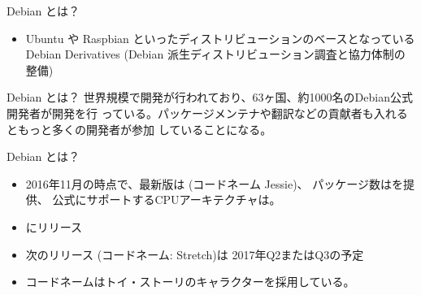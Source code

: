 \begin{frame}{Debian とは？}

\begin{minipage}{0.45\hsize}
  \begin{itemize}
\item Ubuntu や Raspbian といったディストリビューションのベースとなっている \\
	Debian Derivatives (Debian 派生ディストリビューション調査と協力体制の整備)
  \end{itemize}
\end{minipage} 
\begin{minipage}{0.45\hsize}
 \begin{center} 
 \end{center}
\end{minipage}

\end{frame}

\begin{frame}{Debian とは？}
 世界規模で開発が行われており、63ヶ国、約1000名のDebian公式開発者が開発を行
 っている。パッケージメンテナや翻訳などの貢献者も入れるともっと多くの開発者が参加
 していることになる。
 \begin{center}
 \end{center}
\end{frame}

\begin{frame}{Debian とは？}
\begin{itemize}[<+->]
 \item 2016年11月の時点で、\pause 最新版は {\color{red}{Debian 8.6}} (コードネーム Jessie)、\pause
 パッケージ数は{\color{red}{約43000}}を提供、\pause
 公式にサポートするCPUアーキテクチャは{\color{red}{10}}。\pause
 \item {\color{red}{約2年毎}}にリリース
 \item 次のリリース (コードネーム: {\color{red}{}}Stretch)は 2017年Q2またはQ3の予定
 \item コードネームはトイ・ストーリのキャラクターを採用している。
  \begin{center}
  \end{center}
\end{itemize}
\end{frame}


